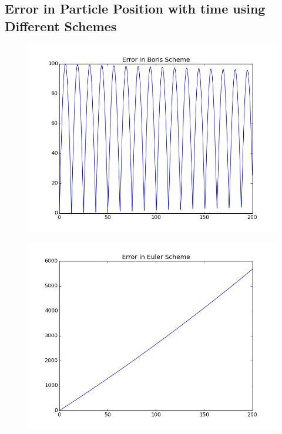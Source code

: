 \documentclass[11pt, a4paper]{article}
\begin{document}
\subsection{Error in Particle Position with time using Different Schemes}
\begin{figure}[H]
 \centering
 \includegraphics[width = \textwidth]{q1_error_boris.png}
\end{figure}
\begin{figure}[H]
 \centering
 \includegraphics[width = \textwidth]{q1_error_euler.png}
\end{figure}
\end{document}
